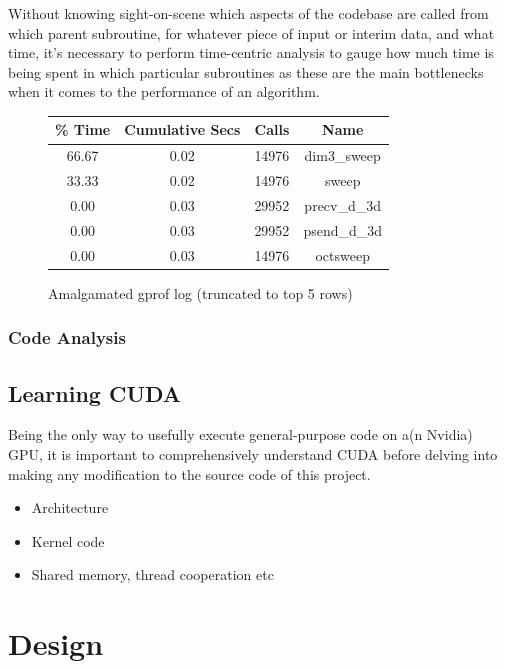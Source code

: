 \documentclass[conference]{IEEEtran}
\begin{document}
Without knowing sight-on-scene which aspects of the codebase are called from which parent subroutine, for whatever piece of input or interim data, and what time, it's necessary to perform time-centric analysis to gauge how much time is being spent in which particular subroutines as these are the main bottlenecks when it comes to the performance of an algorithm.



\begin{figure}[h]
    \centering
    \begin{tabular}{ | c | c | c | c | }
\hline
\% Time & Cumulative Secs & Calls & Name \\
\hline
66.67 & 0.02 & 14976 & dim3\_sweep \\
33.33 & 0.02 & 14976 & sweep \\
0.00  & 0.03 & 29952 & precv\_d\_3d \\
0.00  & 0.03 & 29952 & psend\_d\_3d \\
0.00  & 0.03 & 14976 & octsweep \\
\hline
    \end{tabular}
    \caption{Amalgamated gprof log (truncated to top 5 rows)}
    \label{table:gprof_log}
\end{figure}


\subsubsection{Code Analysis}

\subsection{Learning CUDA}

Being the only way to usefully execute general-purpose code on a(n Nvidia) GPU, it is important to comprehensively understand CUDA before delving into making any modification to the source code of this project.



\begin{itemize}
    \item Architecture
    \item Kernel code
    \item Shared memory, thread cooperation etc
\end{itemize}


\section{Design}\label{design}
\end{document}
